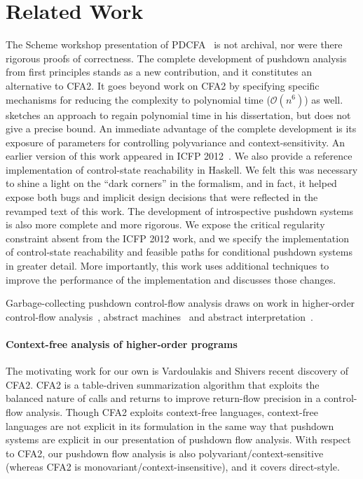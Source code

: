 \section{Related Work}
\label{sec:related}

The Scheme workshop presentation of PDCFA~\citep{dvanhorn:Earl2010Pushdown} is not archival, nor were there rigorous proofs of correctness.
The complete development of pushdown analysis from first principles stands as a
new contribution, and it constitutes an alternative to CFA2.
It goes beyond work on CFA2 by specifying specific mechanisms for reducing the complexity to polynomial time ($\mathcal{O}(n^6)$) as well.
\citet{local:vardoulakis-diss12} sketches an approach to regain polynomial time in his dissertation, but does not give a precise bound.
An immediate advantage of the complete development is its exposure of
parameters for controlling polyvariance and context-sensitivity.
An earlier version of this work appeared in ICFP 2012~\cite{mattmight:Earl:2012:Introspective}.
We also provide a reference implementation of control-state reachability in Haskell.
We felt this was necessary to shine a light on the ``dark corners'' in the
formalism, and in fact, it helped expose both bugs and implicit design
decisions that were reflected in the revamped text of this work.
The development of introspective pushdown systems is also more complete and
more rigorous.
We expose the critical regularity constraint absent from the ICFP 2012 work,
and we specify the implementation of control-state reachability and feasible paths for
conditional pushdown systems in greater detail.
More importantly, this work uses additional techniques to improve the
performance of the implementation and discusses those changes.


Garbage-collecting pushdown control-flow analysis draws on work in higher-order
control-flow analysis~\cite{mattmight:Shivers:1991:CFA}, abstract
machines~\cite{mattmight:Felleisen:1987:CESK} and abstract
interpretation~\cite{mattmight:Cousot:1977:AI}.






\paragraph{Context-free analysis of higher-order programs}
The motivating work
for our own is Vardoulakis and Shivers recent discovery of
  CFA2.
CFA2 is a table-driven summarization algorithm that exploits the balanced
nature of calls and returns to improve return-flow precision in a control-flow
analysis.
Though CFA2 exploits context-free languages, context-free languages are not
explicit in its formulation in the same way that pushdown systems are explicit in
our presentation of pushdown flow analysis.
With respect to CFA2, our pushdown flow analysis is also polyvariant/context-sensitive (whereas CFA2 is monovariant/context-insensitive), and it covers direct-style.

